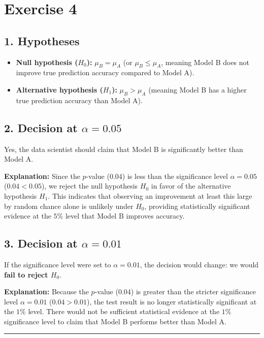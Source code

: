 \documentclass[11pt]{article}
\begin{document}
\section*{Exercise 4}

\subsection*{1. Hypotheses}
\begin{itemize}
    \item \textbf{Null hypothesis ($H_0$):} $\mu_B = \mu_A$ (or $\mu_B \le \mu_A$, meaning Model B does not improve true prediction accuracy compared to Model A).
    \item \textbf{Alternative hypothesis ($H_1$):} $\mu_B > \mu_A$ (meaning Model B has a higher true prediction accuracy than Model A).
\end{itemize}

\subsection*{2. Decision at $\alpha = 0.05$}
Yes, the data scientist should claim that Model B is significantly better than Model A. 

\textbf{Explanation:} Since the $p$-value ($0.04$) is less than the significance level $\alpha = 0.05$ ($0.04 < 0.05$), we reject the null hypothesis $H_0$ in favor of the alternative hypothesis $H_1$. This indicates that observing an improvement at least this large by random chance alone is unlikely under $H_0$, providing statistically significant evidence at the $5\%$ level that Model B improves accuracy.

\subsection*{3. Decision at $\alpha = 0.01$}
If the significance level were set to $\alpha = 0.01$, the decision would change: we would \textbf{fail to reject $H_0$}.

\textbf{Explanation:} Because the $p$-value ($0.04$) is greater than the stricter significance level $\alpha = 0.01$ ($0.04 > 0.01$), the test result is no longer statistically significant at the $1\%$ level. There would not be sufficient statistical evidence at the $1\%$ significance level to claim that Model B performs better than Model A.

\bigskip
\hrule
\bigskip
\end{document}
